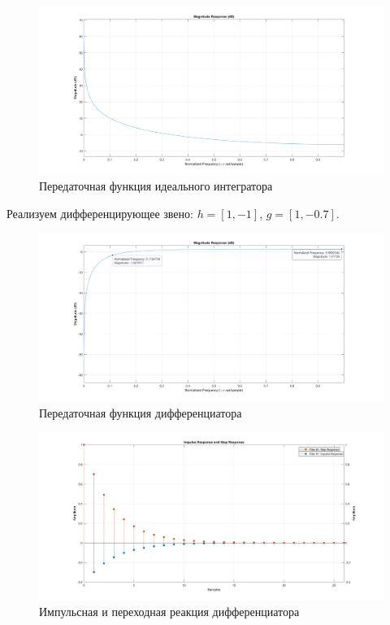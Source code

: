 \documentclass[12pt,a4paper]{article}
\begin{document}
	\begin{figure}[H]
		\centering
		\includegraphics[width=1.0\linewidth]{res/2_7_idealach.png}
		\caption{Передаточная функция идеального интегратора}
	\end{figure}	
	
	Реализуем дифференцирующее звено: $h = [1, -1]$, $g = [1, -0.7]$.
	
	\begin{figure}[H]
		\centering
		\includegraphics[width=1.0\linewidth]{res/2_8_ach.png}
		\caption{Передаточная функция дифференциатора}
	\end{figure}
	
	\begin{figure}[H]
		\centering
		\includegraphics[width=1.0\linewidth]{res/2_8_impulse.png}
		\caption{Импульсная и переходная реакция дифференциатора}
	\end{figure}	
	
\end{document}
